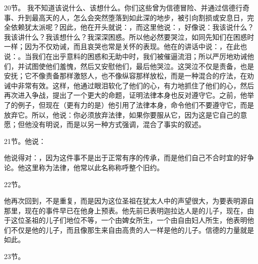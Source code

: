 20节。 我不知道该说什么、该想什么。你们这些曾为信德冒险、并通过信德行奇事、升到最高天的人，怎么会突然堕落到如此深的地步，被引向割损或安息日，完全依赖犹太派呢？因此，他在开头就说：，而这里他说：，好像说：我该说什么？我该讲什么？我该想什么？我深深困惑。所以他必然要哭泣，如同先知们在困惑时一样；因为不仅劝诫，而且哀哭也常是关怀的表现。他在的讲话中说：，在此也说：。当我们在出乎意料的困惑和无助中时，我们被催逼流泪；所以严厉地劝诫他们，并试图使他们羞愧，然后又安慰他们，最后他哭泣。这哭泣不仅是责备，也是安抚；它不像责备那样激怒人，也不像纵容那样放松，而是一种混合的疗法，在劝诫中非常有效。这样，他通过眼泪软化了他们的心，有力地抓住了他们的心，然后再次进入争战，提出了一个更大的命题，证明法律本身也反对遵守它。之前，他举了的例子，但现在（更有力的是）他引用了法律本身，命令他们不要遵守它，而是放弃它。所以，他说：你必须放弃法律，如果你要服从它，因为这是它自己的意愿；但他没有明说，而是以另一种方式强调，混合了事实的叙述。\par

21节。他说：\par

他说得对：，因为这件事不是出于正常有序的传承，而是他们自己不合时宜的好争论。他这里称为法律，他常以此名称称呼整个旧约。\par

22节。\par

他再次回到，不是重复，而是因为这位圣祖在犹太人中的声望很大，为要表明源自那里，现在的事件早已在他身上预表。他先前已表明迦拉达人是的儿子，现在，由于这位圣祖的儿子们地位不等，一个由婢女所生，一个由自由妇人所生，他表明他们不仅是他的儿子，而且像那生来自由高贵的人一样是他的儿子。信德的力量就是如此。\par

23节。\par

